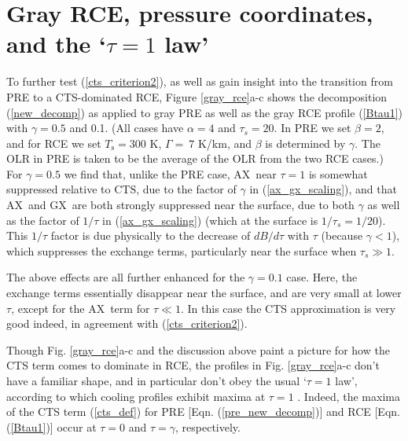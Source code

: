 \documentclass{ametsoc}
\newcommand{\eqnref}[1]{(\ref{#1})}
\newcommand{\Ts}{\ensuremath{T_\mathrm{s}}}
\newcommand{\taus}{\ensuremath{\tau_s}}
\newcommand{\AX}{\ensuremath{\mathrm{AX}}}
\newcommand{\GX}{\ensuremath{\mathrm{GX}}}
\newcommand{\CTS}{\ensuremath{\mathrm{CTS}}}
\begin{document}
\section{Gray RCE, pressure coordinates, and the `$\tau=1$ law'} \label{sec_gray_rce}
To further test \eqnref{cts_criterion2}, as well as gain insight into the transition from PRE to a CTS-dominated RCE, Figure \ref{gray_rce}a-c shows the decomposition \eqnref{new_decomp} as applied to gray PRE as well as the gray RCE profile \eqnref{Btau1} with $\gamma=0.5$ and 0.1. (All cases have $\alpha=4$ and $\taus=20$. In PRE we set $\beta=2$, and for RCE we set $\Ts = 300 $ K, $\Gamma=\ 7$ K/km, and $\beta$ is determined by $\gamma$. The OLR in PRE is taken to be the average of the OLR from the two RCE cases.) For $\gamma=0.5$ we find that, unlike the PRE case, \AX\ near $\tau=1$ is somewhat suppressed relative to \CTS, due to the factor of $\gamma$ in \eqnref{ax_gx_scaling}, and that \AX\ and \GX\ are both strongly suppressed near the surface, due to both $\gamma$ as well as the factor of $1/\tau$ in \eqnref{ax_gx_scaling} (which at the surface is $1/\taus = 1/20$). This $1/\tau$ factor is due physically to the decrease of $dB/d\tau$ with $\tau$ (because $\gamma<1$), which suppresses the exchange terms, particularly near the surface when $\taus \gg 1$.

The above effects are all further enhanced for the $\gamma=0.1$ case. Here, the exchange terms essentially disappear near the surface, and are very small at lower $\tau$, except for the \AX\ term for $\tau \ll 1$. In this case the CTS approximation is very good indeed, in agreement with \eqnref{cts_criterion2}.

Though Fig. \ref{gray_rce}a-c and the discussion above paint a picture for how the CTS term comes to dominate in RCE, the profiles in Fig. \ref{gray_rce}a-c don't have a familiar shape, and in particular don't obey the usual `$\tau=1$ law', according to which cooling profiles exhibit maxima at $\tau=1$  \citep[e.g.][see also Appendix B]{huang2014,wallace2006,petty2006}. Indeed, the maxima of the CTS term \eqnref{cts_def} for PRE  [Eqn. \eqnref{pre_new_decomp}] and RCE [Eqn. \eqnref{Btau1}] occur at $\tau=0$ and $\tau=\gamma$, respectively. 
\end{document}
